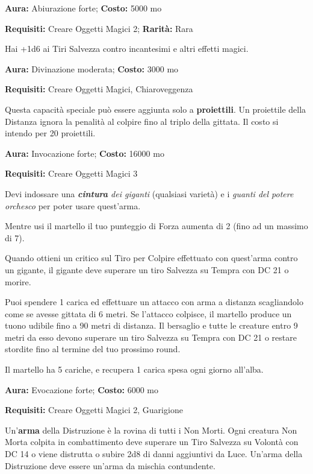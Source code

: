 \begin{multicols}{2}

\textbf{Aura:} Abiurazione forte; \textbf{Costo:} 5000 mo

\textbf{Requisiti:} Creare Oggetti Magici 2; \textbf{Rarità:} Rara

Hai +1d6 ai Tiri Salvezza contro incantesimi e altri effetti magici.


\textbf{Aura:} Divinazione moderata; \textbf{Costo:} 3000 mo

\textbf{Requisiti:} Creare Oggetti Magici, Chiaroveggenza

Questa capacità speciale può essere aggiunta solo a \textbf{proiettili}. Un proiettile della Distanza ignora la penalità al colpire fino al triplo della gittata. Il costo si intendo per 20 proiettili.


\textbf{Aura:} Invocazione forte; \textbf{Costo:} 16000 mo

\textbf{Requisiti:} Creare Oggetti Magici 3

Devi indossare una \emph{\textbf{cintura} dei giganti} (qualsiasi varietà) e i \emph{guanti del potere orchesco} per poter usare quest'arma.

Mentre usi il martello il tuo punteggio di Forza aumenta di 2 (fino ad un massimo di 7).

Quando ottieni un critico sul Tiro per Colpire effettuato con quest'arma contro un gigante, il gigante deve superare un tiro Salvezza su Tempra con DC 21 o morire.

Puoi spendere 1 carica ed effettuare un attacco con arma a distanza scagliandolo come se avesse gittata di 6 metri. Se l'attacco colpisce, il martello produce un tuono udibile fino a 90 metri di distanza. Il bersaglio e tutte le creature entro 9 metri da esso devono superare un tiro Salvezza su Tempra con DC 21 o restare stordite fino al termine del tuo prossimo round.

Il martello ha 5 cariche, e recupera 1 carica spesa ogni giorno all'alba.


\textbf{Aura:} Evocazione forte; \textbf{Costo:} 6000 mo

\textbf{Requisiti:} Creare Oggetti Magici 2, Guarigione

Un'\textbf{arma} della Distruzione è la rovina di tutti i Non Morti. Ogni creatura Non Morta colpita in combattimento deve superare un Tiro Salvezza su Volontà con DC 14 o viene distrutta o subire 2d8 di danni aggiuntivi da Luce. Un'arma della Distruzione deve essere un'arma da mischia contundente.


\end{multicols}
